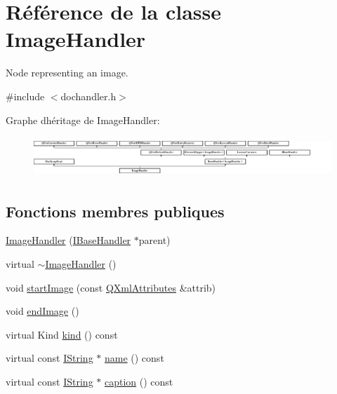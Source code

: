 \hypertarget{class_image_handler}{}\section{Référence de la classe Image\+Handler}
\label{class_image_handler}


Node representing an image.  




{\ttfamily \#include $<$dochandler.\+h$>$}

Graphe d\textquotesingle{}héritage de Image\+Handler\+:\begin{figure}[H]
\begin{center}
\leavevmode
\includegraphics[height=1.523810cm]{class_image_handler}
\end{center}
\end{figure}
\subsection*{Fonctions membres publiques}
\begin{DoxyCompactItemize}
\item 
\hyperlink{class_image_handler_a9a5da110366dc1a55e3262e4e93bcdc3}{Image\+Handler} (\hyperlink{class_i_base_handler}{I\+Base\+Handler} $\ast$parent)
\item 
virtual \hyperlink{class_image_handler_ab75b24e2b7e59d2a6f57173a3a688da6}{$\sim$\+Image\+Handler} ()
\item 
void \hyperlink{class_image_handler_a5cb1f2af496d9e8d576e6a97d9183fa3}{start\+Image} (const \hyperlink{class_q_xml_attributes}{Q\+Xml\+Attributes} \&attrib)
\item 
void \hyperlink{class_image_handler_aae665494acc2f1e0a1682db1729a1b2e}{end\+Image} ()
\item 
virtual Kind \hyperlink{class_image_handler_aa5195fa093404687932c8d53641e699f}{kind} () const 
\item 
virtual const \hyperlink{class_i_string}{I\+String} $\ast$ \hyperlink{class_image_handler_a356583d7dddcb7550b42b26fdacf2cda}{name} () const 
\item 
virtual const \hyperlink{class_i_string}{I\+String} $\ast$ \hyperlink{class_image_handler_a8352fc63b0168b53564be8b82741ca46}{caption} () const 
\end{DoxyCompactItemize}
